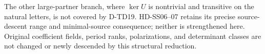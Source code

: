 The other large-partner branch, where $\ker U$ is nontrivial and
transitive on the natural letters, is not covered by D-TD19.
HD-SS06--07 retains its precise source-descent range and minimal-source
consequence; neither is strengthened here. Original coefficient fields,
period ranks, polarizations, and determinant classes are not changed
or newly descended by this structural reduction.


